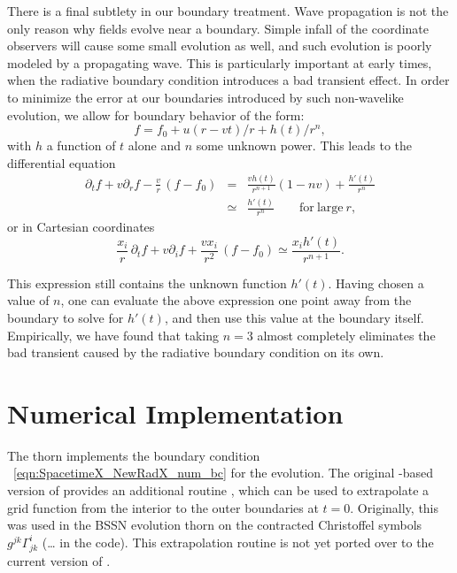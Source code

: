 There is a final subtlety in our boundary treatment.  Wave propagation
is not the only reason why fields evolve near a boundary.  Simple
infall of the coordinate observers will cause some small evolution as
well, and such evolution is poorly modeled by a propagating wave. This
is particularly important at early times, when the radiative boundary
condition introduces a bad transient effect. In order to minimize the
error at our boundaries introduced by such non-wavelike evolution, we
allow for boundary behavior of the form:
\begin{equation}
f = f_0 + u(r-vt)/r + h(t)/r^n ,
\label{eq:radpower}
\end{equation}
with $h$ a function of $t$ alone and $n$ some unknown power. This
leads to the differential equation
\begin{eqnarray}
\partial_t f + v \partial_r f
- \frac{v}{r} \, (f - f_0) &=&
\frac{v h(t)}{r^{n+1}} \left( 1 - n v \right)
+ \frac{h'(t)}{r^n} \nonumber \\
&\simeq& \frac{h'(t)}{r^n} \qquad \mathrm{for\ large\ } r ,
\end{eqnarray}
or in Cartesian coordinates
\begin{equation}
\frac{x_i}{r} \, \partial_t f + v \partial_i f + \frac{v x_i}{r^2} \,
\left( f - f_0 \right) \simeq \frac{x_i h'(t)}{r^{n+1}} .
\label{eqn:SpacetimeX_NewRadX_num_bc}
\end{equation}

This expression still contains the unknown function $h'(t)$. Having
chosen a value of $n$, one can evaluate the above expression one point
away from the boundary to solve for $h'(t)$, and then use this value
at the boundary itself.  Empirically, we have found that taking $n=3$
almost completely eliminates the bad transient caused by the radiative
boundary condition on its own.

\section{Numerical Implementation}
The thorn implements the boundary condition
~\eqref{eqn:SpacetimeX_NewRadX_num_bc} for the evolution.  The original
-based version of  provides an additional
routine , which can be used to extrapolate
a grid function from the interior to the outer boundaries at $t=0$.
Originally, this was used in the BSSN evolution thorn 
on the contracted Christoffel symbols
$g^{jk} \Gamma^i_{jk}$ (\ldots{} in the code).
This extrapolation routine is not yet ported over to the current version
of .


